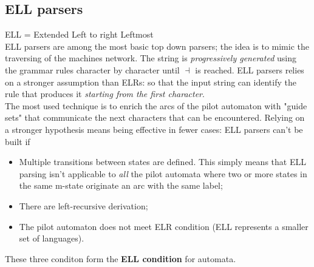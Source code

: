 \documentclass[10pt,a4paper]{article}
\begin{document}
			\subsection{ELL parsers}
				ELL = Extended Left to right Leftmost\\
				ELL parsers are among the most basic top down parsers; the idea is to mimic the traversing of the machines network. The string is \emph{progressively generated} using the grammar rules character by character until $\dashv$ is reached. ELL parsers relies on a stronger assumption than ELRs: so that the input string can identify the rule that produces it \emph{starting from the first character}.\\
				The most used technique is to enrich the arcs of the pilot automaton with "guide sets" that communicate the next characters that can be encountered. Relying on a stronger hypothesis means being effective in fewer cases: ELL parsers can't be built if
				\begin{itemize}
					\item Multiple transitions between states are defined. This simply means that ELL parsing isn't applicable to \emph{all} the pilot automata where two or more states in the same m-state originate an arc with the same label;
					\item There are left-recursive derivation;
					\item The pilot automaton does not meet ELR condition (ELL represents a smaller set of languages). 
				\end{itemize}
				These three conditon form the \textbf{ELL condition} for automata.
				
\end{document}

